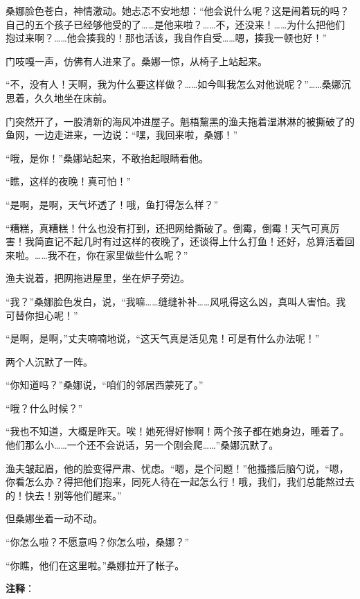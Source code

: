 \documentclass[12pt,UTF-8,openany]{ctexbook}
\begin{document}
\begin{large}
    桑娜脸色苍白，神情激动。她忐忑不安地想：“他会说什么呢？这是闹着玩的吗？自己的五个孩子已经够他受的了……是他来啦？……不，还没来！……为什么把他们抱过来啊？……他会揍我的！那也活该，我自作自受……嗯，揍我一顿也好！”
    
    门吱嘎一声，仿佛有人进来了。桑娜一惊，从椅子上站起来。
    
    “不，没有人！天啊，我为什么要这样做？……如今叫我怎么对他说呢？”……桑娜沉思着，久久地坐在床前。
    
    门突然开了，一股清新的海风冲进屋子。魁梧黧黑的渔夫拖着湿淋淋的被撕破了的鱼网，一边走进来，一边说：“嘿，我回来啦，桑娜！”
    
    “哦，是你！”桑娜站起来，不敢抬起眼睛看他。
    
    “瞧，这样的夜晚！真可怕！”
    
    “是啊，是啊，天气坏透了！哦，鱼打得怎么样？”
    
    “糟糕，真糟糕！什么也没有打到，还把网给撕破了。倒霉，倒霉！天气可真厉害！我简直记不起几时有过这样的夜晚了，还谈得上什么打鱼！还好，总算活着回来啦。……我不在，你在家里做些什么呢？”
    
    渔夫说着，把网拖进屋里，坐在炉子旁边。
    
    “我？”桑娜脸色发白，说，“我嘛……缝缝补补……风吼得这么凶，真叫人害怕。我可替你担心呢！”
    
    “是啊，是啊，”丈夫喃喃地说，“这天气真是活见鬼！可是有什么办法呢！”
    
    两个人沉默了一阵。
    
    “你知道吗？”桑娜说，“咱们的邻居西蒙死了。”
    
    “哦？什么时候？”
    
    “我也不知道，大概是昨天。唉！她死得好惨啊！两个孩子都在她身边，睡着了。他们那么小……一个还不会说话，另一个刚会爬……”桑娜沉默了。
    
    渔夫皱起眉，他的脸变得严肃、忧虑。“嗯，是个问题！”他搔搔后脑勺说，“嗯，你看怎么办？得把他们抱来，同死人待在一起怎么行！哦，我们，我们总能熬过去的！快去！别等他们醒来。”
    
    但桑娜坐着一动不动。
    
    “你怎么啦？不愿意吗？你怎么啦，桑娜？”
    
    “你瞧，他们在这里啦。”桑娜拉开了帐子。
    
\end{large}


\newpage

\textbf{注释}：

\vspace{-1em}
\end{document}
